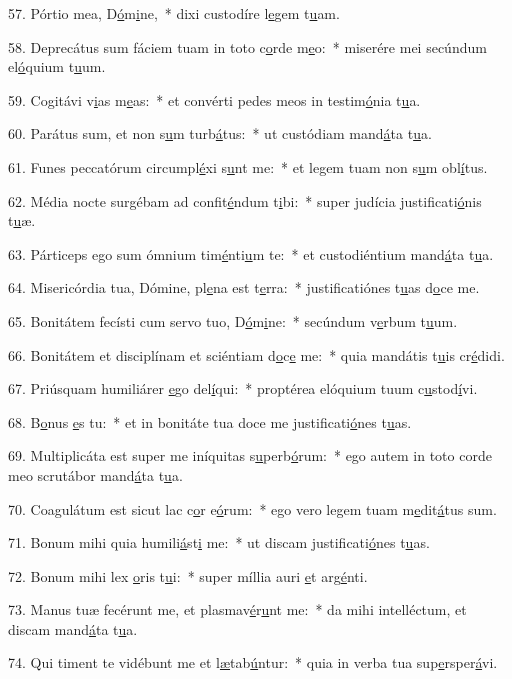 57. Pórtio mea, D\uline{ó}m\uline{i}ne,~* dixi custodíre l\uline{e}gem t\uline{u}am.\par 
58. Deprecátus sum fáciem tuam in toto c\uline{o}rde m\uline{e}o:~* miserére mei secúndum el\uline{ó}quium t\uline{u}um.\par 
59. Cogitávi v\uline{i}as m\uline{e}as:~* et convérti pedes meos in testim\uline{ó}nia t\uline{u}a.\par 
60. Parátus sum, et non s\uline{u}m turb\uline{á}tus:~* ut custódiam mand\uline{á}ta t\uline{u}a.\par 
61. Funes peccatórum circumpl\uline{é}xi s\uline{u}nt me:~* et legem tuam non s\uline{u}m obl\uline{í}tus.\par 
62. Média nocte surgébam ad confit\uline{é}ndum t\uline{i}bi:~* super judícia justificati\uline{ó}nis t\uline{u}æ.\par 
63. Párticeps ego sum ómnium tim\uline{é}nti\uline{u}m te:~* et custodiéntium mand\uline{á}ta t\uline{u}a.\par 
64. Misericórdia tua, Dómine, pl\uline{e}na est t\uline{e}rra:~* justificatiónes t\uline{u}as d\uline{o}ce me.\par 
65. Bonitátem fecísti cum servo tuo, D\uline{ó}m\uline{i}ne:~* secúndum v\uline{e}rbum t\uline{u}um.\par 
66. Bonitátem et disciplínam et sciéntiam d\uline{o}c\uline{e} me:~* quia mandátis t\uline{u}is cr\uline{é}didi.\par 
67. Priúsquam humiliárer \uline{e}go del\uline{í}qui:~* proptérea elóquium tuum c\uline{u}stod\uline{í}vi.\par 
68. B\uline{o}nus \uline{e}s tu:~* et in bonitáte tua doce me justificati\uline{ó}nes t\uline{u}as.\par 
69. Multiplicáta est super me iníquitas s\uline{u}perb\uline{ó}rum:~* ego autem in toto corde meo scrutábor mand\uline{á}ta t\uline{u}a.\par 
70. Coagulátum est sicut lac c\uline{o}r e\uline{ó}rum:~* ego vero legem tuam m\uline{e}dit\uline{á}tus sum.\par 
71. Bonum mihi quia humili\uline{á}st\uline{i} me:~* ut discam justificati\uline{ó}nes t\uline{u}as.\par 
72. Bonum mihi lex \uline{o}ris t\uline{u}i:~* super míllia auri \uline{e}t arg\uline{é}nti.\par 
73. Manus tuæ fecérunt me, et plasmav\uline{é}r\uline{u}nt me:~* da mihi intelléctum, et discam mand\uline{á}ta t\uline{u}a.\par 
74. Qui timent te vidébunt me et l\uline{æ}tab\uline{ú}ntur:~* quia in verba tua sup\uline{e}rsper\uline{á}vi.\par 
